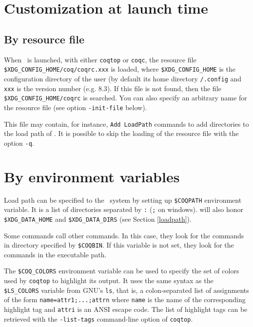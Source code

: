 \section[Customization]{Customization at launch time}

\subsection{By resource file}

When \Coq\ is launched, with either {\tt coqtop} or {\tt coqc}, the
resource file \verb:$XDG_CONFIG_HOME/coq/coqrc.xxx: is loaded, where
\verb:$XDG_CONFIG_HOME: is the configuration directory of the user (by
default its home directory \verb!/.config! and \verb:xxx: is the version
number (e.g. 8.3).  If this file is not found, then the file
\verb:$XDG_CONFIG_HOME/coqrc: is searched. You can also specify an
arbitrary name for the resource file (see option \verb:-init-file:
below).


This file may contain, for instance, \verb:Add LoadPath: commands to add
directories to the load path of \Coq.
It is possible to skip the loading of the resource file with the
option \verb:-q:.

\section{By environment variables\label{EnvVariables}
\label{envars}}

Load path can be specified to the \Coq\ system by setting up
\verb:$COQPATH: environment variable. It is a list of directories
separated by \verb|:| (\verb|;| on windows). {\Coq} will also honor
\verb:$XDG_DATA_HOME: and \verb:$XDG_DATA_DIRS: (see Section
\ref{loadpath}).

Some {\Coq} commands call other {\Coq} commands. In this case, they
look for the commands in directory specified by \verb:$COQBIN:. If
this variable is not set, they look for the commands in the executable
path.

The \verb:$COQ_COLORS: environment variable can be used to specify the set of
colors used by {\tt coqtop} to highlight its output. It uses the same syntax as
the \verb:$LS_COLORS: variable from GNU's {\tt ls}, that is, a colon-separated
list of assignments of the form \verb:name=attr1;...;attrn: where {\tt name} is
the name of the corresponding highlight tag and {\tt attri} is an ANSI escape
code. The list of highlight tags can be retrieved with the {\tt -list-tags}
command-line option of {\tt coqtop}.

